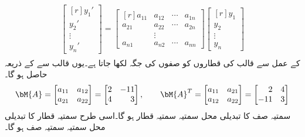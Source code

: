 \begin{gather}
\begin{aligned}
\begin{bmatrix*}[r]
y_1'\\
y_2'\\
\vdots\\
y_n'
\end{bmatrix*}=
\begin{bmatrix*}[r]
a_{11}&a_{12}&\cdots &a_{1n}\\
a_{21}& a_{22}&\cdots &a_{2n}\\
&\vdots & &\\
a_{n1}&a_{n2}&\cdots &a_{nn}
\end{bmatrix*}
\begin{bmatrix*}[r]
y_1\\
y_2\\
\vdots\\
y_n
\end{bmatrix*}
\end{aligned}
\end{gather}
 کے عمل سے قالب کی قطاروں کو صفوں کی جگہ لکھا جاتا ہے۔یوں  قالب  سے  کے ذریعہ   حاصل ہو گا۔ 
\begin{gather*}
\begin{aligned}
\bM{A}=
\begin{bmatrix*}[r]
a_{11} & a_{12}\\
a_{21}& a_{22}
\end{bmatrix*}=
\begin{bmatrix*}[r]
2&-11\\
4&3
\end{bmatrix*},\quad \quad
\bM{A}^T=
\begin{bmatrix*}[r]
a_{11}& a_{21}\\
a_{12}& a_{22}
\end{bmatrix*}=
\begin{bmatrix*}[r]
2 &4\\
-11&3
\end{bmatrix*}
\end{aligned}
\end{gather*}
سمتیہ صف  کا تبدیلی محل سمتیہ  سمتیہ قطار ہو گا۔اسی طرح سمتیہ قطار  کا تبدیلی محل سمتیہ  سمتیہ صف ہو گا۔

